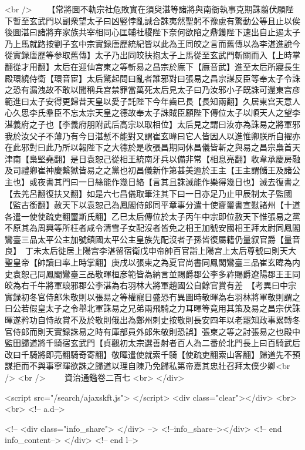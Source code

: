 <br />
　　【常將圖不軌宗社危敗實在須臾湛等諸將與南衙執事克期誅翦伏願陛下暫至玄武門以副衆望太子曰凶竪悖亂誠合誅夷然聖躬不豫慮有驚動公等且止以俟後圖湛曰諸將弃家族共宰相同心匡輔社稷陛下奈何欲陷之鼎鑊陛下速出自止遏太子乃上馬就路按劉子玄中宗實録唐歷統紀皆以此為王同皎之言而舊傳以為李湛進說今從實録唐歷等参取舊傳】太子乃出同皎扶抱太子上馬從至玄武門斬關而入【上時掌翻從才用翻】太后在迎仙宫東之等斬易之昌宗於廡下【廡音武】進至太后所寢長生殿環繞侍衛【環音宦】太后驚起問曰亂者誰邪對曰張易之昌宗謀反臣等奉太子令誅之恐有漏洩故不敢以聞稱兵宫禁罪當萬死太后見太子曰乃汝邪小子既誅可還東宫彦範進曰太子安得更歸昔天皇以愛子託陛下今年齒已長【長知兩翻】久居東宫天意人心久思李氏羣臣不忘太宗天皇之德故奉太子誅賊臣願陛下傳位太子以順天人之望李湛義府之子也【李義府朋附武后高宗以取相位】太后見之謂曰汝亦為誅易之將軍邪我於汝父子不薄乃有今日湛慙不能對又謂崔玄暐曰它人皆因人以進惟卿朕所自擢亦在此邪對曰此乃所以報陛下之大德於是收張昌期同休昌儀皆斬之與易之昌宗梟首天津南【梟堅堯翻】是日袁恕己從相王統南牙兵以備非常【相息亮翻】收韋承慶房融及司禮卿崔神慶繫獄皆易之之黨也初昌儀新作第甚美逾於王主【王主謂儲王及諸公主也】或夜書其門曰一日絲能作幾日絡【言其且誅滅能作樂得幾日也】滅去復書之【去羌呂翻復扶又翻】如是六七昌儀取筆注其下曰一日亦足乃止甲辰制太子監國【監古銜翻】赦天下以袁恕己為鳳閣侍郎同平章事分遣十使齎璽書宣慰諸州【十道各遣一使使疏吏翻璽斯氏翻】乙巳太后傳位於太子丙午中宗即位赦天下惟張易之黨不原其為周興等所枉者咸令清雪子女配沒者皆免之相王加號安國相王拜太尉同鳳閣鸞臺三品太平公主加號鎮國太平公主皇族先配沒者子孫皆復屬籍仍量叙官爵【量音良】　丁未太后徙居上陽宫李湛留宿衛戊申帝帥百官詣上陽宫上太后尊號曰則天大聖皇帝【帥讀曰率上時掌翻】庚戌以張柬之為夏官尚書同鳳閣鸞臺三品崔玄暐為内史袁恕己同鳳閣鸞臺三品敬暉桓彦範皆為納言並賜爵郡公李多祚賜爵遼陽郡王王同皎為右千牛將軍琅邪郡公李湛為右羽林大將軍趙國公自餘官賞有差　【考異曰中宗實録初冬官侍郎朱敬則以張易之等權寵日盛恐冇異圖時敬暉為右羽林將軍敬則謂之曰公若假皇太子之令舉北軍誅易之兄弟兩飛騎之力耳暉等竟用其策及易之昌宗伏誅暉遂矜功自恃故賞不及於敬則俄出為鄭州刺史按敬則長安四年以老罷知政事累轉冬官侍郎而則天實録誅易之時有庫部員外郎朱敬則恐誤】張柬之等之討張易之也殿中監田歸道將千騎宿玄武門【貞觀初太宗選善射者百人為二番於北門長上曰百騎武后改曰千騎將即亮翻騎奇寄翻】敬暉遣使就索千騎【使疏吏翻索山客翻】歸道先不預謀拒而不與事寧暉欲誅之歸道以理自陳乃免歸私第帝嘉其忠壯召拜太僕少卿<br />
<br />
　　資治通鑑卷二百七  <br>
   </div> 

<script src="/search/ajaxskft.js"> </script>
 <div class="clear"></div>
<br>
<br>
 <!-- a.d-->

 <!--
<div class="info_share">
</div> 
-->
 <!--info_share--></div>   <!-- end info_content-->
  </div> <!-- end l-->


